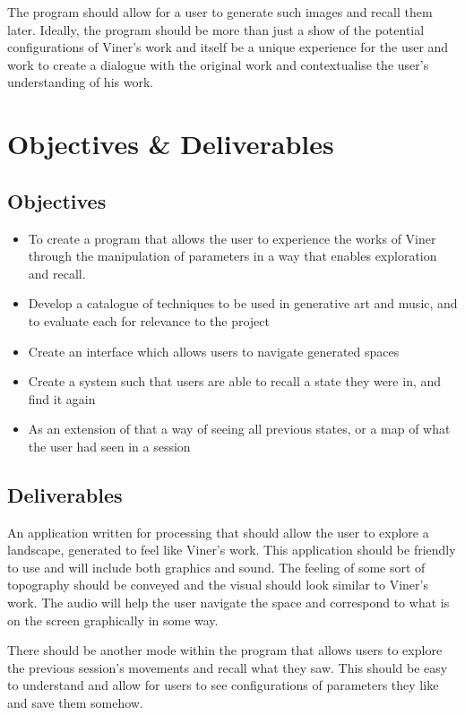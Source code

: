 The program should allow for a user to generate such images and recall them
later. Ideally, the program should be more than just a show of the potential
configurations of Viner's work and itself be a unique experience for the user
and work to create a dialogue with the original work and contextualise the
user's understanding of his work.

\section{Objectives \& Deliverables}
\subsection{Objectives}

\begin{itemize}
    \item To create a program that allows the user to experience the works of
        Viner through the manipulation of parameters in a way that enables
        exploration and recall.
    \item Develop a catalogue of techniques to be used in generative art and
        music, and to evaluate each for relevance to the project
    \item Create an interface which allows users to navigate generated spaces
    \item Create a system such that users are able to recall a state they were
        in, and find it again
    \item As an extension of that a way of seeing all previous states, or a map
        of what the user had seen in a session
\end{itemize}

\subsection{Deliverables}
An application written for processing that should allow the user to explore a
landscape, generated to feel like Viner's work. This application should be
friendly to use and will include both graphics and sound. The feeling of some
sort of topography should be conveyed and the visual should look similar to
Viner's work. The audio will help the user navigate the space and correspond to
what is on the screen graphically in some way.

There should be another mode within the program that allows users to explore the
previous session's movements and recall what they saw. This should be easy to
understand and allow for users to see configurations of parameters they like and
save them somehow.

